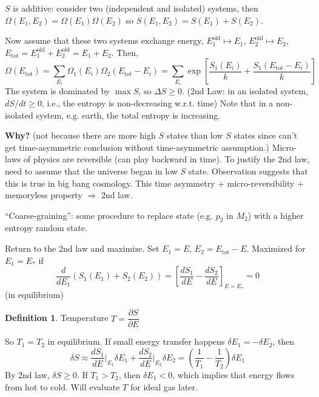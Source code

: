 \documentclass{article}
\theoremstyle{definition}
\newtheorem{defn}{Definition}[section]
\theoremstyle{remark}
\theoremstyle{plain}
\begin{document}
$S$ is additive: consider two (independent and isolated) systems, then $\Omega(E_1,E_2)=\Omega(E_1)\Omega(E_2)$ so $S(E_1,E_2)=S(E_1)+S(E_2)$.

Now assume that these two systems exchange energy, $E^{\text{old}}_1\mapsto E_1$, $E_2^{\text{old}}\mapsto E_2$, $E_{\text{tot}}=E_1^{\text{old}}+E_2^{\text{old}}=E_1+E_2$. Then,
\[\Omega(E_{\text{tot}})=\sum_{E_i}\Omega_1(E_i)\Omega_2(E_{\text{tot}}-E_i)=\sum_{E_i}\exp\left[\dfrac{S_1(E_i)}{k}+\dfrac{S_1(E_{\text{tot}}-E_i)}{k}\right]\]
The system is dominated by $\max S$, so $\Delta S\ge 0$. (2nd Law: in an isolated system, $dS/dt\ge 0$, i.e., the entropy is non-decreasing w.r.t. time) Note that in a non-isolated system, e.g. earth, the total entropy is increasing.

\textbf{Why?} (not because there are more high $S$ states than low $S$ states since can't get time-asymmetric conclusion without time-asymmetric assumption.) 
Micro-laws of physics are reversible (can play backward in time).
To justify the 2nd law, need to assume that the universe began in low $S$ state. Observation suggests that this is true in big bang cosmology. This time asymmetry + micro-reversibility + memoryless property $\Rightarrow$ 2nd law.

``Coarse-graining'': some procedure to replace state (e.g. $p_2$ in $M_2$) with a higher entropy random state.


Return to the 2nd law and maximize. Set $E_1=E$, $E_2=E_{\text{tot}}-E$. Maximized for $E_1=E_\ast$ if
\[\dfrac{d}{dE_1}(S_1(E_1)+S_2(E_2))=\left[\dfrac{dS_1}{dE}-\dfrac{dS_2}{dE}\right]_{E=E_\ast}=0\]
(in equilibrium)

\begin{defn}
    Temperature $T=\dfrac{\partial S}{\partial E}$
\end{defn}
So $T_1=T_2$ in equilibrium. If small energy transfer happens $\delta E_1=-\delta E_2$, then
\[\delta S\approx \dfrac{dS_1}{dE}\Bigg|_{E_1}\delta E_1+\dfrac{dS_2}{dE}\Bigg|_{E_2}\delta E_2=\left(\dfrac{1}{T_1}-\dfrac{1}{T_2}\right)\delta E_1\]
By 2nd law, $\delta S\ge0$. If $T_1>T_2$, then $\delta E_1<0$, which implies that energy flows from hot to cold. Will evaluate $T$ for ideal gas later.
\end{document}

